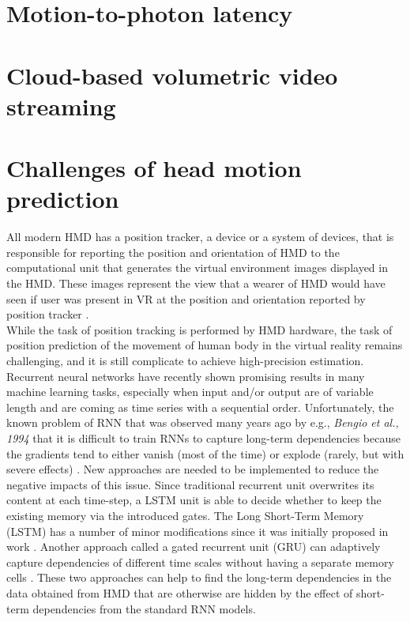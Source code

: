 \section{Motion-to-photon latency}
\label{sec:theorie:m2p}

\section{Cloud-based volumetric video streaming}
\label{sec:theorie:cloud}

\section{Challenges of head motion prediction}
\label{sec:theorie:head_pred}
All modern HMD has a position tracker, a device or a system of devices, that is responsible for reporting  the position and orientation of HMD to the computational unit that generates the virtual environment images displayed in the HMD. These images represent the view that a wearer of HMD would have seen if user was present in VR at the position and orientation reported by position tracker \cite{hmd}.\\
While the task of position tracking is performed by HMD hardware, the task of position prediction of the movement of human body in the virtual reality remains challenging, and it is still complicate to achieve high-precision estimation. Recurrent neural networks have recently shown promising results in many machine learning tasks, especially when input and/or output are of variable length and are coming as time series with a sequential order.  Unfortunately, the known problem of RNN that was observed many years ago by e.g., \textit{Bengio et al., 1994} that it is difficult to train RNNs to capture long-term dependencies because the gradients tend to either vanish (most of the time) or explode (rarely, but with severe effects) \cite{rnn_difficults}. New approaches are needed to be implemented to reduce the negative impacts of this issue. Since traditional recurrent unit overwrites its content at each time-step, a LSTM unit is able to decide whether to keep the existing memory via the introduced gates. The Long Short-Term Memory (LSTM) has a number of minor modifications \cite{empirical_evaluation} since it was initially proposed in work \cite{lstm_orig}. Another approach called a gated recurrent unit (GRU) can adaptively capture dependencies of different time scales without having a separate memory cells \cite{empirical_evaluation}. These two approaches can help to find the long-term dependencies in the data obtained from HMD that are otherwise are hidden by the effect of short-term dependencies from the standard RNN models.\\
